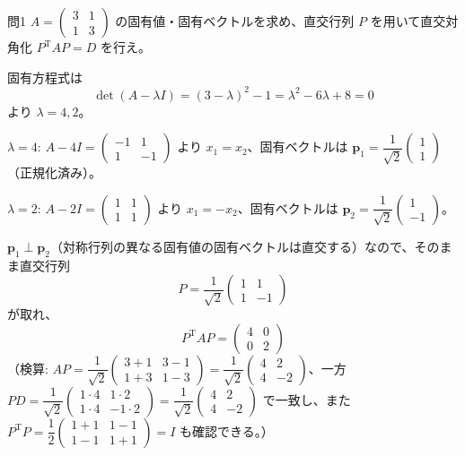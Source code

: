 \documentclass[a4paper,11pt]{article}
\begin{document}
\clearpage
\begin{mondaiboxS}{問1}
$A = \begin{pmatrix} 3 & 1 \\ 1 & 3 \end{pmatrix}$ の固有値・固有ベクトルを求め、直交行列 $P$ を用いて直交対角化 $P^{\mathrm{T}}AP = D$ を行え。
\end{mondaiboxS}
\kaitou
固有方程式は
\[
\det(A - \lambda I) = (3-\lambda)^{2} - 1 = \lambda^{2} - 6\lambda + 8 = 0
\]
より $\lambda = 4, 2$。

$\lambda = 4$: $A - 4I = \begin{pmatrix} -1 & 1 \\ 1 & -1 \end{pmatrix}$ より $x_1 = x_2$、固有ベクトルは $\bm{p}_1 = \dfrac{1}{\sqrt{2}}\begin{pmatrix}1\\1\end{pmatrix}$（正規化済み）。

$\lambda = 2$: $A - 2I = \begin{pmatrix} 1 & 1 \\ 1 & 1 \end{pmatrix}$ より $x_1 = -x_2$、固有ベクトルは $\bm{p}_2 = \dfrac{1}{\sqrt{2}}\begin{pmatrix}1\\-1\end{pmatrix}$。

$\bm{p}_1 \perp \bm{p}_2$（対称行列の異なる固有値の固有ベクトルは直交する）なので、そのまま直交行列
\[
P = \frac{1}{\sqrt{2}}\begin{pmatrix} 1 & 1 \\ 1 & -1 \end{pmatrix}
\]
が取れ、
\[
\boxed{\; P^{\mathrm{T}} A P = \begin{pmatrix} 4 & 0 \\ 0 & 2 \end{pmatrix} \;}
\]
（検算: $AP = \dfrac{1}{\sqrt2}\begin{pmatrix}3+1 & 3-1\\1+3 & 1-3\end{pmatrix} = \dfrac{1}{\sqrt2}\begin{pmatrix}4 & 2\\4 & -2\end{pmatrix}$、一方 $PD = \dfrac{1}{\sqrt2}\begin{pmatrix}1\cdot4 & 1\cdot2\\1\cdot4 & -1\cdot2\end{pmatrix} = \dfrac{1}{\sqrt2}\begin{pmatrix}4&2\\4&-2\end{pmatrix}$ で一致し、また $P^{\mathrm{T}}P = \dfrac12\begin{pmatrix}1+1 & 1-1\\1-1&1+1\end{pmatrix} = I$ も確認できる。）
\end{document}
